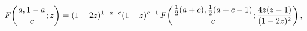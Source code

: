 \[\mathop{F\/}\nolimits\!\left({a,1-a\atop c};z\right)=(1-2z)^{1-a-c}(1-z)^{c-1}%
\mathop{F\/}\nolimits\!\left({\frac{1}{2}(a+c),\frac{1}{2}(a+c-1)\atop c};%
\frac{4z(z-1)}{(1-2z)^{2}}\right),\]